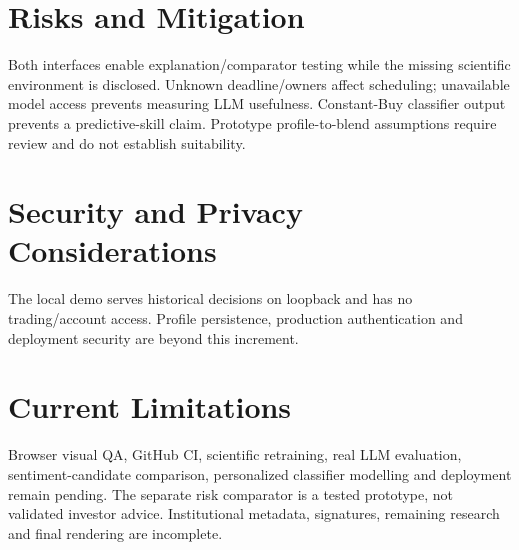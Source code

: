 \section{Risks and Mitigation}
Both interfaces enable explanation/comparator testing while the missing scientific environment is disclosed. Unknown deadline/owners affect scheduling; unavailable model access prevents measuring LLM usefulness. Constant-Buy classifier output prevents a predictive-skill claim. Prototype profile-to-blend assumptions require review and do not establish suitability.
\section{Security and Privacy Considerations}
The local demo serves historical decisions on loopback and has no trading/account access. Profile persistence, production authentication and deployment security are beyond this increment.
\section{Current Limitations}
Browser visual QA, GitHub CI, scientific retraining, real LLM evaluation, sentiment-candidate comparison, personalized classifier modelling and deployment remain pending. The separate risk comparator is a tested prototype, not validated investor advice. Institutional metadata, signatures, remaining research and final rendering are incomplete.
